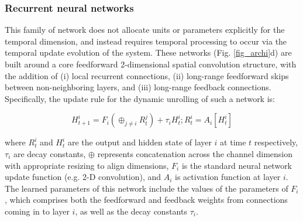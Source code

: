 \subsubsection*{Recurrent neural networks}

This family of network does not allocate units or parameters explicitly for the temporal dimension, and instead requires temporal processing to occur via the temporal update evolution of the system.  These networks (Fig. \ref{fig_archi}d) are built around a core feedforward 2-dimensional spatial convolution structure, with the addition of (i) local recurrent connections, (ii) long-range feedforward skips between non-neighboring layers, and (iii) long-range feedback connections.  
Specifically, the update rule for the dynamic unrolling of such a network is: 

$$H^i_{t+1} = F_i \left ( \oplus_{j \neq i} R^j_t \right )  + \tau_i H^i_t; R^i_t = A_i[H^i_t]$$

where $R^i_t$ and $H^i_t$ are the output and hidden state of layer $i$ at time $t$ respectively,  $\tau_i$  are decay constants, $\oplus$ represents concatenation across the channel dimension with appropriate resizing to align dimensions, $F_i$ is the standard neural network update function (e.g. 2-D convolution), and $A_i$ is activation function at layer $i$.  The learned parameters of this network include the values of the parameters of $F_i$, which comprises both the feedforward and feedback weights from connections coming in to layer $i$, as well as the decay constants $\tau_i$. 



